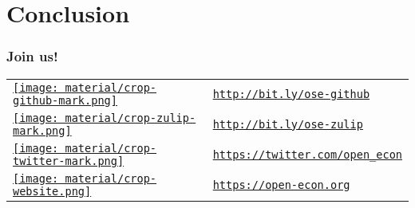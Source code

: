 \section{Conclusion}
\begin{frame}\frametitle{Join us!}\vspace{1.25cm}

\vspace{-0.75cm}


	\begin{table}[]
		\begin{tabularx}{1\textwidth}{>{\centering\arraybackslash}m{1.5cm} >{\centering\arraybackslash}m{3.7cm}}
			\href{http://bit.ly/ose-github}{\texttt{[image: material/crop-github-mark.png]}} & 
			\href{http://bit.ly/ose-github}{\texttt{http://bit.ly/ose-github}} \\[1cm]
			
			\href{http://bit.ly/ose-zulip}{\texttt{[image: material/crop-zulip-mark.png]}} & 
			\href{http://bit.ly/ose-zulip}{\texttt{http://bit.ly/ose-zulip}}    \\[0.8cm]
			
			\href{https://twitter.com/open_econ}{\texttt{[image: material/crop-twitter-mark.png]}} & 
			\href{https://twitter.com/open_econ}{\texttt{https://twitter.com/open\_econ}} \\[0.8cm]
			
			\href{https://open-econ.org}{\texttt{[image: material/crop-website.png]}} & \href{https://open-econ.org}{\texttt{https://open-econ.org}}
		\end{tabularx}
	\end{table}

	


 \end{frame}

